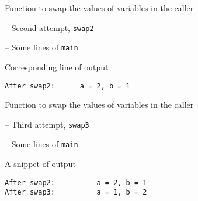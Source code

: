 \documentclass[usenames,dvipsnames,aspectratio=169]{beamer}
\begin{document}
\begin{frame}[fragile]{Function to swap the values of variables in the caller}
  \begin{alertblock}{ -- Second attempt, \texttt{swap2}}
    \scriptsize
    \vspace{-.3cm}
    
    \vspace{-.3cm}
  \end{alertblock}
  \begin{exampleblock}{ -- Some lines of \texttt{main}}
    \scriptsize
    \vspace{-.3cm}
    
    \vspace{-.3cm}
  \end{exampleblock}
  \begin{block}{Corresponding line of output}
    \scriptsize
    \begin{verbatim}
After swap2:      a = 2, b = 1
\end{verbatim}
  \end{block}
\end{frame}

\begin{frame}[fragile]{Function to swap the values of variables in the caller}
  \begin{exampleblock}{ -- Third attempt, \texttt{swap3}}
    \scriptsize
    \vspace{-.3cm}
    
    \vspace{-.3cm}
  \end{exampleblock}
  \begin{exampleblock}{ -- Some lines of \texttt{main}}
    \scriptsize
    \vspace{-.3cm}
    
    \vspace{-.3cm}
  \end{exampleblock}
  \begin{block}{A snippet of output}
    \scriptsize
    \begin{verbatim}
After swap2:		  a = 2, b = 1
After swap3:		  a = 1, b = 2
\end{verbatim}
  \end{block}
\end{frame}
\end{document}

